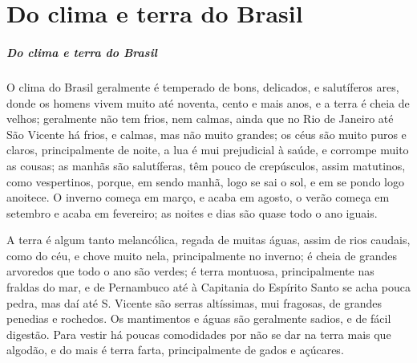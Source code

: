 
\newcommand{\especie}[1]{\textsc{#1}\index{#1}}

\chapter[Do clima e terra do Brasil e de algumas cousas notáveis que
se acham na terra como no mar]{Do clima e terra do Brasil}


\paragraph{Do clima e terra do Brasil}

O clima do Brasil geralmente é temperado de bons, delicados, e
salutíferos ares, donde os homens vivem muito até noventa, cento e
mais anos, e a terra é cheia de velhos; geralmente não tem frios, nem
calmas, ainda que no Rio de Janeiro até São Vicente há frios, e calmas,
mas não muito grandes; os céus são muito puros e claros,
principalmente de noite, a lua é mui prejudicial à saúde, e corrompe
muito as cousas; as manhãs são salutíferas, têm pouco de crepúsculos,
assim matutinos, como vespertinos, porque, em sendo manhã, logo se sai
o sol, e em se pondo logo anoitece. O inverno começa em março, e acaba
em agosto, o verão começa em setembro e acaba em fevereiro; as noites e
dias são quase todo o ano iguais. 

 A terra é algum tanto melancólica, regada de muitas águas, assim de
rios caudais, como do céu, e chove muito nela, principalmente no
inverno; é cheia de grandes arvoredos que todo o ano são verdes; é
terra montuosa, principalmente nas fraldas do mar, e de Pernambuco até
à Capitania do Espírito Santo se acha pouca pedra, mas daí até S.
Vicente são serras altíssimas, mui fragosas, de grandes penedias e
rochedos. Os mantimentos e águas são geralmente sadios, e de fácil
digestão. Para vestir há poucas comodidades por não se dar na terra
mais que algodão, e do mais é terra farta, principalmente de gados e
açúcares. 


